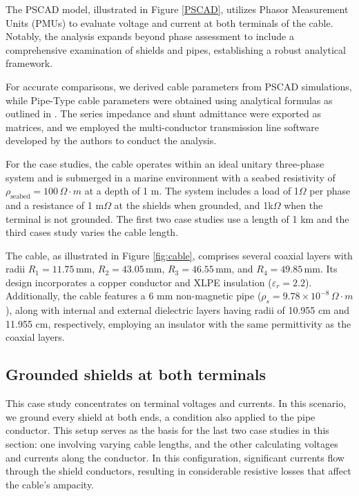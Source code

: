 \documentclass[journal,transmag]{IEEEtran}
\begin{document}
The PSCAD model, illustrated in Figure \ref{PSCAD}, utilizes Phasor Measurement Units (PMUs) to evaluate voltage and current at both terminals of the cable. Notably, the analysis expands beyond phase assessment to include a comprehensive examination of shields and pipes, establishing a robust analytical framework.

For accurate comparisons, we derived cable parameters from PSCAD simulations, while Pipe-Type cable parameters were obtained using analytical formulas as outlined in \cite{Ametani2015}. The series impedance and shunt admittance were exported as matrices, and we employed the multi-conductor transmission line software developed by the authors to conduct the analysis.

For the case studies, the cable operates within an ideal unitary three-phase system and is submerged in a marine environment with a seabed resistivity of \(\rho_{\text{seabed}} = 100 \, \Omega \cdot m\) at a depth of 1 m. The system includes a load of 1$\Omega$ per phase and a resistance of 1 m$\Omega$ at the shields when grounded, and 1k$\Omega$ when the terminal is not grounded. The first two case studies use a length of 1 km and the third cases study varies the cable length.

The cable, as illustrated in Figure \ref{fig:cable}, comprises several coaxial layers with radii \(R_1 = 11.75 \, \text{mm}\), \(R_2 = 43.05 \, \text{mm}\), \(R_3 = 46.55 \, \text{mm}\), and \(R_4 = 49.85 \, \text{mm}\). Its design incorporates a copper conductor and XLPE insulation (\(\varepsilon_r = 2.2\)). Additionally, the cable features a 6 mm non-magnetic pipe (\(\rho_s = 9.78 \times 10^{-8} \, \Omega \cdot m\)), along with internal and external dielectric layers having radii of 10.955 cm and 11.955 cm, respectively, employing an insulator with the same permittivity as the coaxial layers.

\subsection{Grounded shields at both terminals}

This case study concentrates on terminal voltages and currents. In this scenario, we ground every shield at both ends, a condition also applied to the pipe conductor. This setup serves as the basis for the last two case studies in this section: one involving varying cable lengths, and the other calculating voltages and currents along the conductor. In this configuration, significant currents flow through the shield conductors, resulting in considerable resistive losses that affect the cable's ampacity.
\end{document}
